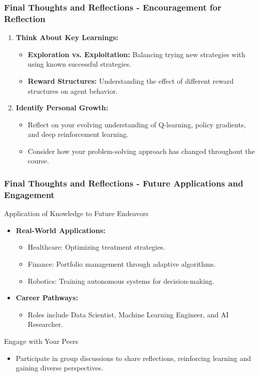 \documentclass[aspectratio=169]{beamer}
\begin{document}
\begin{frame}[fragile]
    \frametitle{Final Thoughts and Reflections - Encouragement for Reflection}
    \begin{enumerate}
        \item \textbf{Think About Key Learnings:}
        \begin{itemize}
            \item \textbf{Exploration vs. Exploitation:} Balancing trying new strategies with using known successful strategies.
            \item \textbf{Reward Structures:} Understanding the effect of different reward structures on agent behavior.
        \end{itemize}
        \item \textbf{Identify Personal Growth:}
        \begin{itemize}
            \item Reflect on your evolving understanding of Q-learning, policy gradients, and deep reinforcement learning.
            \item Consider how your problem-solving approach has changed throughout the course.
        \end{itemize}
    \end{enumerate}
\end{frame}

\begin{frame}[fragile]
    \frametitle{Final Thoughts and Reflections - Future Applications and Engagement}
    \begin{block}{Application of Knowledge to Future Endeavors}
        \begin{itemize}
            \item \textbf{Real-World Applications:}
            \begin{itemize}
                \item Healthcare: Optimizing treatment strategies.
                \item Finance: Portfolio management through adaptive algorithms.
                \item Robotics: Training autonomous systems for decision-making.
            \end{itemize}
            \item \textbf{Career Pathways:}
            \begin{itemize}
                \item Roles include Data Scientist, Machine Learning Engineer, and AI Researcher.
            \end{itemize}
        \end{itemize}
    \end{block}
    \begin{block}{Engage with Your Peers}
        \begin{itemize}
            \item Participate in group discussions to share reflections, reinforcing learning and gaining diverse perspectives.
        \end{itemize}
    \end{block}
\end{frame}
\end{document}

